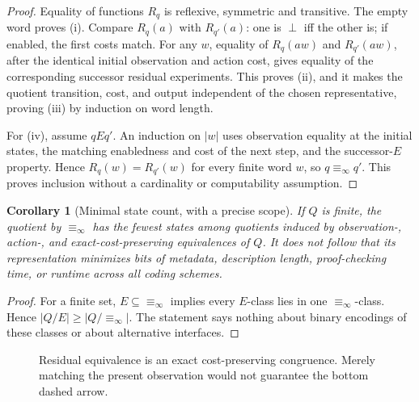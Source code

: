\documentclass[11pt,letterpaper]{article}
\newtheorem{corollary}[theorem]{Corollary}
\newcommand{\botx}{\perp}
\newcommand{\Rinf}{\equiv_{\!\infty}}
\begin{document}
\begin{proof}
Equality of functions $R_q$ is reflexive, symmetric and transitive. The empty word proves (i). Compare $R_q(a)$ with $R_{q'}(a)$: one is $\botx$ iff the other is; if enabled, the first costs match. For any $w$, equality of $R_q(aw)$ and $R_{q'}(aw)$, after the identical initial observation and action cost, gives equality of the corresponding successor residual experiments. This proves (ii), and it makes the quotient transition, cost, and output independent of the chosen representative, proving (iii) by induction on word length.

For (iv), assume $qEq'$. An induction on $|w|$ uses observation equality at the initial states, the matching enabledness and cost of the next step, and the successor-$E$ property. Hence $R_q(w)=R_{q'}(w)$ for every finite word $w$, so $q\Rinf q'$. This proves inclusion without a cardinality or computability assumption.
\end{proof}
\begin{corollary}[Minimal state count, with a precise scope]\label{cor:mincount}
If $Q$ is finite, the quotient by $\Rinf$ has the fewest states among quotients induced by observation-, action-, and exact-cost-preserving equivalences of $Q$. It does \emph{not} follow that its representation minimizes bits of metadata, description length, proof-checking time, or runtime across all coding schemes.
\end{corollary}
\begin{proof}
For a finite set, $E\subseteq\Rinf$ implies every $E$-class lies in one $\Rinf$-class. Hence $|Q/E|\ge |Q/\Rinf|$. The statement says nothing about binary encodings of these classes or about alternative interfaces.
\end{proof}
\begin{figure}[htbp]\centering
{}
\caption{Residual equivalence is an exact cost-preserving congruence. Merely matching the present observation would not guarantee the bottom dashed arrow.}\label{fig:congruence}
\end{figure}
\end{document}
